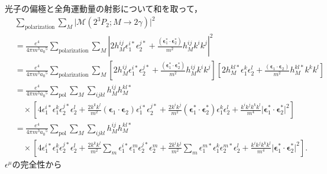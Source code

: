 光子の偏極と全角運動量の射影について和を取って，
\begin{align*}
  & \sum_\text{polarization} \sum_M \lvert\mathcal{M}(2^3P_2;M \to 2\gamma)\rvert^2 \\
  &= \frac{e^4}{4\pi m^3 a_0{}^5} \sum_\text{polarization} \sum_M
  \left\lvert 2h_M^{ij} \epsilon_1^{i\ast} \epsilon_2^{j\ast}
  + \frac{(\boldsymbol{\epsilon}_1^\ast \cdot \boldsymbol{\epsilon}_2^\ast)}{m^2} h_M^{ij} k^ik^j \right\rvert^2 \\
  &= \frac{e^4}{4\pi m^3 a_0{}^5} \sum_\text{polarization} \sum_M
  \left[ 2h_M^{ij} \epsilon_1^{i\ast} \epsilon_2^{j\ast}
  + \frac{(\boldsymbol{\epsilon}_1^\ast \cdot \boldsymbol{\epsilon}_2^\ast)}{m^2} h_M^{ij} k^ik^j \right]
  \left[ 2h_M^{kl\ast} \epsilon_1^k \epsilon_2^l
  + \frac{(\boldsymbol{\epsilon}_1 \cdot \boldsymbol{\epsilon}_2)}{m^2} h_M^{kl\ast} k^kk^l \right] \\
  &= \frac{e^4}{4\pi m^3 a_0{}^5} \sum_\text{pol} \sum_M \sum_{ijkl} h_M^{ij} h_M^{kl\ast} \\
  & \quad \times
  \left[ 4 \epsilon_1^{i\ast} \epsilon_1^k \epsilon_2^{j\ast} \epsilon_2^l
  + \frac{2k^kk^l}{m^2} (\boldsymbol{\epsilon}_1 \cdot \boldsymbol{\epsilon}_2) \epsilon_1^{i\ast} \epsilon_2^{j\ast}
  + \frac{2k^ik^j}{m^2} (\boldsymbol{\epsilon}_1^\ast \cdot \boldsymbol{\epsilon}_2^\ast) \epsilon_1^k \epsilon_2^l
  + \frac{k^ik^jk^kk^l}{m^4} \lvert\boldsymbol{\epsilon}_1^\ast \cdot \boldsymbol{\epsilon}_2^\ast\rvert^2 \right] \\
  &= \frac{e^4}{4\pi m^3 a_0{}^5} \sum_\text{pol} \sum_M \sum_{ijkl} h_M^{ij} h_M^{kl\ast} \\
  & \quad \times
  \left[ 4 \epsilon_1^{i\ast} \epsilon_1^k \epsilon_2^{j\ast} \epsilon_2^l
  + \frac{2k^kk^l}{m^2} \sum_m \epsilon_1^{i\ast} \epsilon_1^m \epsilon_2^{j\ast} \epsilon_2^m
  + \frac{2k^ik^j}{m^2} \sum_m \epsilon_1^{m\ast} \epsilon_1^k \epsilon_2^{m\ast} \epsilon_2^l
  + \frac{k^ik^jk^kk^l}{m^4} \lvert\boldsymbol{\epsilon}_1^\ast \cdot \boldsymbol{\epsilon}_2^\ast\rvert^2 \right] .
\end{align*}
$\epsilon^\mu$の完全性から
